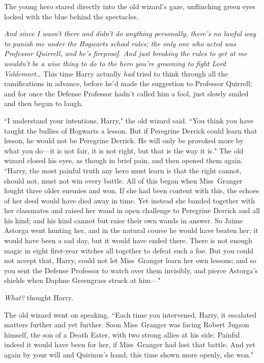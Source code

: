 The young hero stared directly into the old wizard's gaze, unflinching green eyes locked with the blue behind the spectacles.

\emph{And since I wasn't there and didn't do anything personally, there's no lawful way to punish me under the Hogwarts school rules; the only one who acted was Professor Quirrell, and he's fireproof. And just breaking the rules to get at me wouldn't be a wise thing to do to the hero you're grooming to fight Lord Voldemort{\ldots}} This time Harry actually \emph{had} tried to think through all the ramifications in advance, before he'd made the suggestion to Professor Quirrell; and for once the Defense Professor hadn't called him a fool, just slowly smiled and then begun to laugh.

``I understand your intentions, Harry," the old wizard said. ``You think you have taught the bullies of Hogwarts a lesson. But if Peregrine Derrick could learn that lesson, he would not be Peregrine Derrick. He will only be provoked more by what you do—it is not fair, it is not right, but that is the way it is." The old wizard closed his eyes, as though in brief pain, and then opened them again. ``Harry, the most painful truth any hero must learn is that the right cannot, should not, must not win every battle. All of this began when Miss~Granger fought three older enemies and won. If she had been content with this, the echoes of her deed would have died away in time. Yet instead she banded together with her classmates and raised her wand in open challenge to Peregrine Derrick and all his kind; and his kind cannot but raise their own wands in answer. So Jaime Astorga went hunting her, and in the natural course he would have beaten her; it would have been a sad day, but it would have ended there. There is not enough magic in eight first-year witches all together to defeat such a foe. But you could not accept that, Harry, could not let Miss~Granger learn her own lessons; and so you sent the Defense Professor to watch over them invisibly, and pierce Astorga's shields when Daphne Greengrass struck at him—"

\emph{What?} thought Harry.

The old wizard went on speaking. ``Each time you intervened, Harry, it escalated matters further and yet further. Soon Miss~Granger was facing Robert Jugson himself, the son of a Death Eater, with two strong allies at his side. Painful indeed it would have been for her, if Miss~Granger had lost that battle. And yet again by your will and Quirinus's hand, this time shown more openly, she won."

